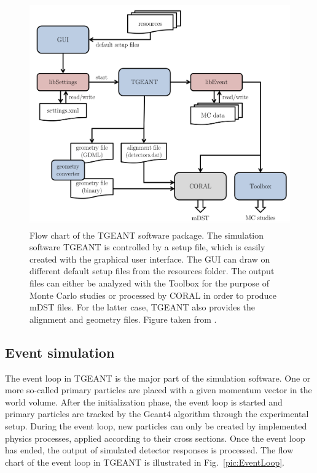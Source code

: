 \begin{figure}[!h]
  \centering
	\includegraphics[scale=0.5]{./gfx/TGEANTflowchart.png}
	\caption{Flow chart of the TGEANT software package. The simulation software TGEANT is controlled by a setup file, which is easily created with the graphical user interface. The GUI can draw on different default setup files from the resources folder. The output files can either be analyzed with the Toolbox for the purpose of Monte Carlo studies or processed by CORAL in order to produce mDST files. For the latter case, TGEANT also provides the alignment and geometry files. Figure taken from \cite{Tobias}.}
	\label{pic:TGEANTflowchart}
\end{figure}

\subsection{Event simulation}

The event loop in TGEANT is the major part of the simulation software. One or more so-called primary particles are placed with a given momentum vector in the world volume. After the initialization phase, the event loop is started and primary particles are tracked by the Geant$4$ algorithm through the experimental setup. During the event loop, new particles can only be created by implemented physics processes, applied according to their cross sections. Once the event loop has ended, the output of simulated detector responses is processed. The flow chart of the event loop in TGEANT is illustrated in Fig.~\ref{pic:EventLoop}.

